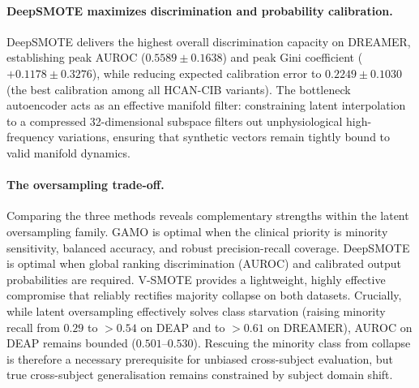 \documentclass[a4paper,fleqn]{cas-sc}
\begin{document}
\paragraph{DeepSMOTE maximizes discrimination and probability calibration.}
DeepSMOTE delivers the highest overall discrimination capacity on DREAMER, establishing peak AUROC ($\mathbf{0.5589\pm0.1638}$) and peak Gini coefficient ($\mathbf{+0.1178\pm0.3276}$), while reducing expected calibration error to $\mathbf{0.2249\pm0.1030}$ (the best calibration among all HCAN-CIB variants). The bottleneck autoencoder acts as an effective manifold filter: constraining latent interpolation to a compressed 32-dimensional subspace filters out unphysiological high-frequency variations, ensuring that synthetic vectors remain tightly bound to valid manifold dynamics.

\paragraph{The oversampling trade-off.}
Comparing the three methods reveals complementary strengths within the latent oversampling family. GAMO is optimal when the clinical priority is minority sensitivity, balanced accuracy, and robust precision-recall coverage. DeepSMOTE is optimal when global ranking discrimination (AUROC) and calibrated output probabilities are required. V-SMOTE provides a lightweight, highly effective compromise that reliably rectifies majority collapse on both datasets. Crucially, while latent oversampling effectively solves class starvation (raising minority recall from $0.29$ to $>0.54$ on DEAP and to $>0.61$ on DREAMER), AUROC on DEAP remains bounded ($0.501$--$0.530$). Rescuing the minority class from collapse is therefore a necessary prerequisite for unbiased cross-subject evaluation, but true cross-subject generalisation remains constrained by subject domain shift.
\end{document}
